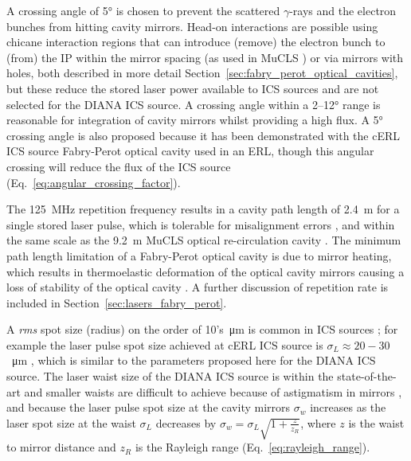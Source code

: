 \documentclass[../main.tex]{subfiles}
\begin{document}
A crossing angle of 5\si{\degree} is chosen to prevent the scattered $\gamma$-rays and the electron bunches from hitting cavity mirrors. Head-on interactions are possible using chicane interaction regions  that can introduce (remove) the electron bunch to (from) the IP within the mirror spacing (as used in MuCLS \cite{eggl2016munich}) or via mirrors with holes, both described in more detail Section~\ref{sec:fabry_perot_optical_cavities}, but these reduce the stored laser power available to ICS sources and are not selected for the DIANA ICS source. A crossing angle within a 2--12\si{\degree} range is reasonable for integration of cavity mirrors \cite{variola2011luminosity} whilst providing a high flux. A 5\si{\degree} crossing angle is also proposed because it has been demonstrated with the cERL ICS source \cite{akagi2016narrow} Fabry-Perot optical cavity used in an ERL, though this angular crossing will reduce the flux of the ICS source (Eq.~\ref{eq:angular_crossing_factor}). 

The 125~\si{\mega\hertz} repetition frequency results in a cavity path length of 2.4~\si{\meter} for a single stored laser pulse, which is tolerable for misalignment errors \cite{zomer2009polarization}, and within the same scale as the 9.2~\si{\meter} MuCLS optical re-circulation cavity \cite{eggl2016munich}. The minimum path length limitation of a Fabry-Perot optical cavity is due to mirror heating, which results in thermoelastic deformation of the optical cavity mirrors causing a loss of stability of the optical cavity \cite{chaikovska2016high}. A further discussion of repetition rate is included in Section~\ref{sec:lasers_fabry_perot}.   

A \textit{rms} spot size (radius) on the order of 10's~\si{\micro\meter} is common in ICS sources \cite{deitrick2017inverse,drebot2019brixs,dupraz2020thomx}; for example the laser pulse spot size achieved at cERL ICS source is $\sigma_{L} \approx 20-30$~\si{\micro\meter} \cite{akagi2016narrow}, which is similar to the parameters proposed here for the DIANA ICS source. The laser waist size of the DIANA ICS source is within the state-of-the-art and smaller waists are difficult to achieve because of astigmatism in mirrors \cite{zomer2009polarization}, and because the laser pulse spot size at the cavity mirrors $\sigma_{w}$ increases as the laser spot size at the waist $\sigma_{L}$ decreases by  $\sigma_{w} = \sigma_{L}\sqrt{1+\frac{z}{z_{R}}}$, where $z$ is the waist to mirror distance and $z_{R}$ is the Rayleigh range (Eq.~\ref{eq:rayleigh_range}).
\end{document}
